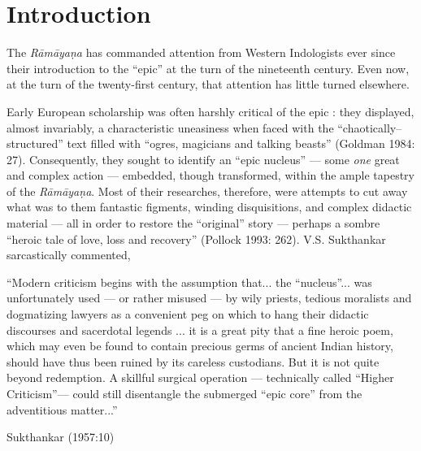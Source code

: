 \chapter*{Introduction}\label{introduction}



The {\sl Rāmāyaṇa} has commanded attention from Western Indologists ever since their introduction to the “epic” at the turn of the nineteenth century. Even now, at the turn of the twenty-first century, that attention has little turned elsewhere.  

Early European scholarship was often harshly critical of the epic : they displayed, almost invariably, a characteristic uneasiness when faced with the “chaotically–structured” text filled with “ogres, magicians and talking beasts” (Goldman 1984: 27). Consequently, they sought to identify an “epic nucleus” --- some {\sl one} great and complex action --- embedded, though transformed, within the ample tapestry of the {\sl Rāmāyaṇa}. Most of their researches, therefore, were attempts to cut away what was to them fantastic figments, winding disquisitions, and complex didactic material --- all in order to restore the “original” story --- perhaps a sombre “heroic tale of love, loss and recovery” (Pollock 1993: 262). V.S. Sukthankar sarcastically commented,  

\begin{myquote}
“Modern criticism begins with the assumption that... the “nucleus”... was unfortunately used --- or rather misused --- by wily priests, tedious moralists and dogmatizing lawyers as a convenient peg on which to hang their didactic discourses and sacerdotal legends ... it is a great pity that a fine heroic poem, which may even be found to contain precious germs of ancient Indian history, should have thus been ruined by its careless custodians. But it is not quite beyond redemption. A skillful surgical operation --- technically called “Higher Criticism”— could still disentangle the submerged “epic core” from the adventitious matter...”

\hfill Sukthankar (1957:10)
\end{myquote}

